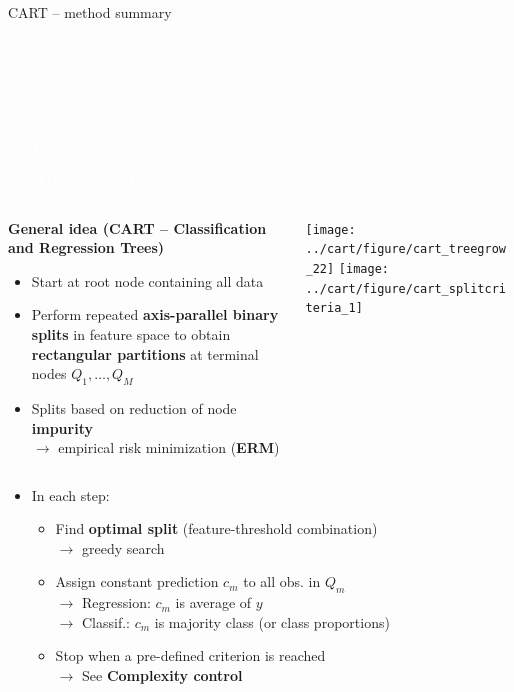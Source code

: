 \documentclass[11pt,compress,t,notes=noshow, xcolor=table]{beamer}
\newcommand{\highlight}[1]{\textcolor{hlcol}{\textbf{#1}}}
\newcommand{\maketag}[2][100]{
  \colorbox{hlcol!#1}{\textcolor{white}{\MakeUppercase{\scriptsize #2}} 
  \vphantom{}}
}
\begin{document}
\begin{frame2}{CART -- method summary}
  \footnotesize

\maketag{regression} \maketag{classification}
\maketag{Nonparametric} \maketag{White-box} \maketag{Feature selection}

\medskip

\begin{columns}[T, totalwidth=\textwidth]
\begin{column}{0.6\textwidth}
\highlight{General idea (CART -- Classification and Regression Trees)}
\begin{itemize}
  \item Start at root node containing all data
  \item Perform repeated \textbf{axis-parallel binary splits} in feature space to obtain
  \textbf{rectangular partitions} at terminal nodes $Q_1, \dots, Q_M$
  \item Splits based on reduction of node \textbf{impurity} \\
  $\rightarrow$ empirical risk minimization (\textbf{ERM})
  
\end{itemize}

\end{column}
\begin{column}{0.45\textwidth}
\texttt{[image: ../cart/figure/cart\_treegrow\_22]}
\texttt{[image:    ../cart/figure/cart\_splitcriteria\_1]} 
\end{column}
\end{columns}

\begin{itemize}
  \item In each step:
  \begin{itemize}
    \item Find \textbf{optimal split} (feature-threshold combination) \\
    $\rightarrow$ greedy search
    \item Assign constant prediction $c_m$ to all obs. in $Q_m$\\
    $\rightarrow$ Regression: $c_m$ is average of $y$ \\
    $\rightarrow$ Classif.: $c_m$ is majority class (or class proportions)
    
  \item Stop when a pre-defined criterion is reached\\
  $\rightarrow$ See \highlight{Complexity control}
  \end{itemize}
\end{itemize}


\end{frame2}
\end{document}
